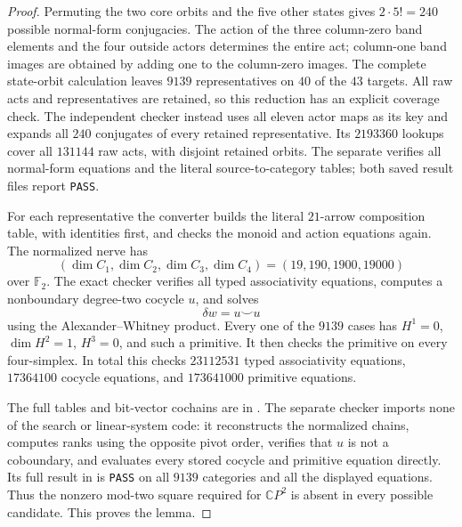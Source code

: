 \begin{proof}
Permuting the two core orbits and the five other states gives
$2\cdot5!=240$ possible normal-form conjugacies.
The action of the three column-zero band elements and the four
outside actors determines the entire act; column-one band images
are obtained by adding one to the column-zero images.
The complete state-orbit calculation leaves $9139$ representatives
on $40$ of the $43$ targets.  All raw acts and representatives
are retained, so this reduction has an explicit coverage check.
The independent checker
 instead uses all
eleven actor maps as its key and expands all $240$ conjugates
of every retained representative.  Its $2193360$ lookups cover
all $131144$ raw acts, with disjoint retained orbits.
The separate  verifies all
normal-form equations and the literal source-to-category tables;
both saved result files report \texttt{PASS}.

For each representative the converter
 builds the literal
$21$-arrow composition table, with identities first, and checks
the monoid and action equations again.  The normalized nerve has
\[
 (\dim C_1,\dim C_2,\dim C_3,\dim C_4)
          =(19,190,1900,19000)
\]
over $\mathbb F_2$.
The exact checker  verifies
all typed associativity equations, computes a nonboundary
degree-two cocycle $u$, and solves
\[
 \delta w=u\smile u
\]
using the Alexander--Whitney product.  Every one of the $9139$
cases has $H^1=0$, $\dim H^2=1$, $H^3=0$, and such a primitive.
It then checks the primitive on every four-simplex.  In total
this checks $23112531$ typed associativity equations,
$17364100$ cocycle equations, and $173641000$ primitive equations.

The full tables and bit-vector cochains are in
.
The separate checker 
imports none of the search or linear-system code: it reconstructs
the normalized chains, computes ranks using the opposite pivot
order, verifies that $u$ is not a coboundary, and evaluates every
stored cocycle and primitive equation directly.
Its full result in
is \texttt{PASS} on all $9139$ categories and all the displayed
equations.
Thus the nonzero mod-two square required for $\mathbb CP^2$
is absent in every possible candidate.  This proves the lemma.
\end{proof}

